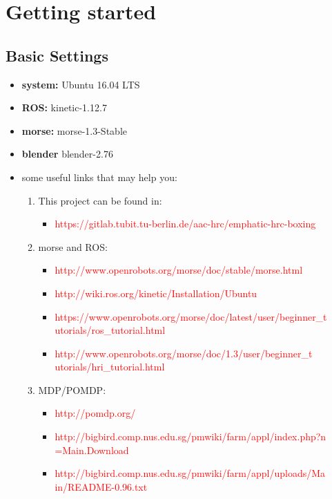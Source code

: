 \chapter{Getting started} 

\section{Basic Settings}
\begin{itemize}
  \item \textbf{system:} Ubuntu 16.04 LTS
  \item \textbf{ROS:} kinetic-1.12.7
  \item \textbf{morse:} morse-1.3-Stable
  \item \textbf{blender} blender-2.76
  \item some useful links that may help you:
  \begin{enumerate}
  	\item This project can be found in:
	  	\begin{itemize}
			\item \textcolor{red}{https://gitlab.tubit.tu-berlin.de/aac-hrc/emphatic-hrc-boxing}
		\end{itemize}
  	\item morse and ROS:
	  	\begin{itemize}
  			\item \textcolor{red}{http://www.openrobots.org/morse/doc/stable/morse.html}
  			\item \textcolor{red}{http://wiki.ros.org/kinetic/Installation/Ubuntu}
  			\item \textcolor{red}{https://www.openrobots.org/morse/doc/latest/user/beginner\_t\\utorials/ros\_tutorial.html}
  			\item \textcolor{red}{http://www.openrobots.org/morse/doc/1.3/user/beginner\_t\\utorials/hri\_tutorial.html}
		\end{itemize}
  	\item MDP/POMDP:
	  	\begin{itemize}
  			\item \textcolor{red}{http://pomdp.org/}
  			\item \textcolor{red}{http://bigbird.comp.nus.edu.sg/pmwiki/farm/appl/index.php?n\\=Main.Download}
  			\item \textcolor{red}{http://bigbird.comp.nus.edu.sg/pmwiki/farm/appl/uploads/Ma\\in/README-0.96.txt}
		\end{itemize}
  \end{enumerate}
\end{itemize}

